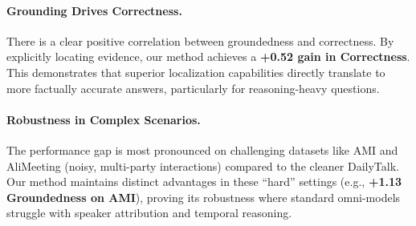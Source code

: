 \documentclass[11pt]{article}
\begin{document}
\paragraph{Grounding Drives Correctness.}
There is a clear positive correlation between groundedness and correctness. By explicitly locating evidence, our method achieves a \textbf{+0.52 gain in Correctness}. This demonstrates that superior localization capabilities directly translate to more factually accurate answers, particularly for reasoning-heavy questions.

\paragraph{Robustness in Complex Scenarios.}
The performance gap is most pronounced on challenging datasets like AMI and AliMeeting (noisy, multi-party interactions) compared to the cleaner DailyTalk. Our method maintains distinct advantages in these ``hard'' settings (e.g., \textbf{+1.13 Groundedness on AMI}), proving its robustness where standard omni-models struggle with speaker attribution and temporal reasoning.
\end{document}
